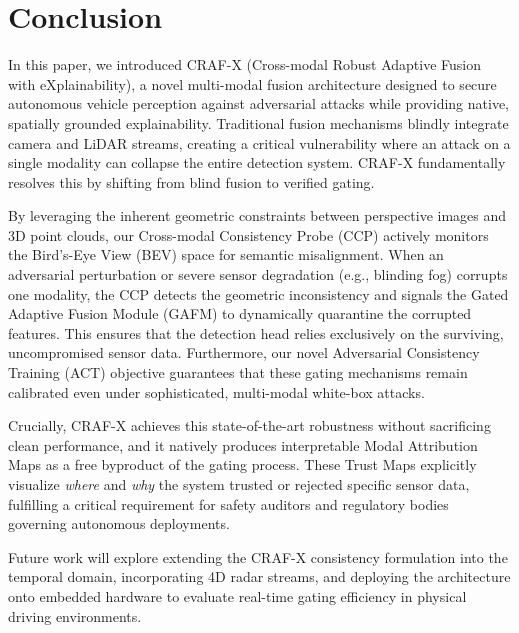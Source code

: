\section{Conclusion}
\label{sec:conclusion}

In this paper, we introduced CRAF-X (Cross-modal Robust Adaptive Fusion with eXplainability), a novel multi-modal fusion architecture designed to secure autonomous vehicle perception against adversarial attacks while providing native, spatially grounded explainability. Traditional fusion mechanisms blindly integrate camera and LiDAR streams, creating a critical vulnerability where an attack on a single modality can collapse the entire detection system. CRAF-X fundamentally resolves this by shifting from blind fusion to verified gating.

By leveraging the inherent geometric constraints between perspective images and 3D point clouds, our Cross-modal Consistency Probe (CCP) actively monitors the Bird's-Eye View (BEV) space for semantic misalignment. When an adversarial perturbation or severe sensor degradation (e.g., blinding fog) corrupts one modality, the CCP detects the geometric inconsistency and signals the Gated Adaptive Fusion Module (GAFM) to dynamically quarantine the corrupted features. This ensures that the detection head relies exclusively on the surviving, uncompromised sensor data. Furthermore, our novel Adversarial Consistency Training (ACT) objective guarantees that these gating mechanisms remain calibrated even under sophisticated, multi-modal white-box attacks.

Crucially, CRAF-X achieves this state-of-the-art robustness without sacrificing clean performance, and it natively produces interpretable Modal Attribution Maps as a free byproduct of the gating process. These Trust Maps explicitly visualize \emph{where} and \emph{why} the system trusted or rejected specific sensor data, fulfilling a critical requirement for safety auditors and regulatory bodies governing autonomous deployments. 

Future work will explore extending the CRAF-X consistency formulation into the temporal domain, incorporating 4D radar streams, and deploying the architecture onto embedded hardware to evaluate real-time gating efficiency in physical driving environments.
